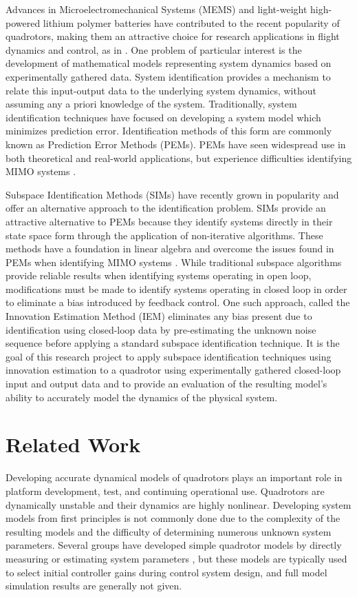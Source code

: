 Advances in Microelectromechanical Systems (MEMS) and light-weight high-powered lithium polymer batteries have contributed to the recent popularity of quadrotors, making them an attractive choice for research applications in flight dynamics and control, as in \cite{hoffmann2007quadrotor, kivrak2006design, mellinger2010control, michael2010grasp}. One problem of particular interest is the development of mathematical models representing system dynamics based on experimentally gathered data. System identification provides a mechanism to relate this input-output data to the underlying system dynamics, without assuming any a priori knowledge of the system. Traditionally, system identification techniques have focused on developing a system model which minimizes prediction error. Identification methods of this form are commonly known as Prediction Error Methods (PEMs). PEMs have seen widespread use in both theoretical and real-world applications, but experience difficulties identifying MIMO systems \cite{qin2006overview, viberg1995subspace}. 

Subspace Identification Methods (SIMs) have recently grown in popularity and offer an alternative approach to the identification problem. SIMs provide an attractive alternative to PEMs because they identify systems directly in their state space form through the application of non-iterative algorithms. These methods have a foundation in linear algebra and overcome the issues found in PEMs when identifying MIMO systems \cite{katayama2005subspace}. While traditional subspace algorithms provide reliable results when identifying systems operating in open loop, modifications must be made to identify systems operating in closed loop in order to eliminate a bias introduced by feedback control. One such approach, called the Innovation Estimation Method (IEM) eliminates any bias present due to identification using closed-loop data by pre-estimating the unknown noise sequence before applying a standard subspace identification technique. It is the goal of this research project to apply subspace identification techniques using innovation estimation to a quadrotor using experimentally gathered closed-loop input and output data and to provide an evaluation of the resulting model's ability to accurately model the dynamics of the physical system.


\section{Related Work}
Developing accurate dynamical models of quadrotors plays an important role in platform development, test, and continuing operational use. Quadrotors are dynamically unstable and their dynamics are highly nonlinear. Developing system models from first principles is not commonly done due to the complexity of the resulting models and the difficulty of determining numerous unknown system parameters. Several groups have developed simple quadrotor models by directly measuring or estimating system parameters \cite{bresciani2008modelling, domingues2009quadrotor, kivrak2006design, pounds2006modelling, schreier2012modeling}, but these models are typically used to select initial controller gains during control system design, and full model simulation results are generally not given. 

